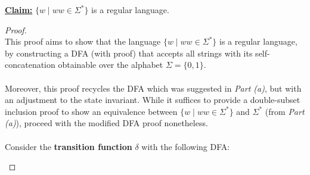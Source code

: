 \documentclass[12pt]{article}
\begin{document}
\textbf{\underline{Claim:}} $\{ w \mid ww \in \Sigma^* \}$ is a regular language.
\begin{proof}
\leavevmode\\
    This proof aims to show that the language $\{ w \mid ww \in \Sigma^* \}$ is a regular language, by constructing a DFA (with proof) that accepts all strings with its self-concatenation obtainable over the alphabet $\Sigma = \{0, 1\}$. \\
    \\
    Moreover, this proof recycles the DFA which was suggested in \textit{Part (a)}, but with an adjustment to the state invariant. While it suffices to provide a double-subset inclusion proof to show an equivalence between $\{ w \mid ww \in \Sigma^* \}$ and $\Sigma^*$ (from \textit{Part (a)}), proceed with the modified DFA proof nonetheless. \\
    \\
    Consider the \textbf{transition function} $\delta$ with the following DFA:
    \begin{center}
\end{center}
\end{proof}
\end{document}
